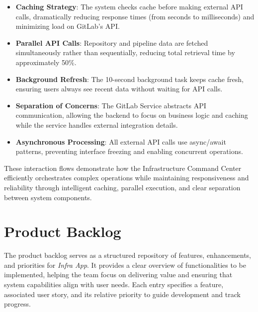 \begin{itemize}
    \item \textbf{Caching Strategy}: The system checks cache before making external API calls, dramatically reducing response times (from seconds to milliseconds) and minimizing load on GitLab's API.
    \item \textbf{Parallel API Calls}: Repository and pipeline data are fetched simultaneously rather than sequentially, reducing total retrieval time by approximately 50\%.
    \item \textbf{Background Refresh}: The 10-second background task keeps cache fresh, ensuring users always see recent data without waiting for API calls.
    \item \textbf{Separation of Concerns}: The GitLab Service abstracts API communication, allowing the backend to focus on business logic and caching while the service handles external integration details.
    \item \textbf{Asynchronous Processing}: All external API calls use async/await patterns, preventing interface freezing and enabling concurrent operations.
\end{itemize}

These interaction flows demonstrate how the Infrastructure Command Center efficiently orchestrates complex operations while maintaining responsiveness and reliability through intelligent caching, parallel execution, and clear separation between system components.

\section{Product Backlog}
The product backlog serves as a structured repository of features, enhancements, and priorities for \textit{Infra App}. It provides a clear overview of functionalities to be implemented, helping the team focus on delivering value and ensuring that system capabilities align with user needs. Each entry specifies a feature, associated user story, and its relative priority to guide development and track progress.

